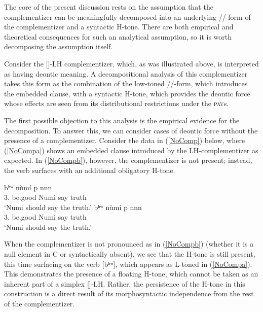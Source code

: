 \documentclass[output=paper,colorlinks,citecolor=brown]{langscibook}
\begin{document}
The core of the present discussion rests on the assumption that the complementizer can be meaningfully decomposed into an underlying /\mbuL/-form of the complementizer and a syntactic H-tone. There are both empirical and theoretical consequences for such an analytical assumption, so it is worth decomposing the assumption itself.

Consider the [\mbuLH]-LH complementizer, which, as was illustrated above, is interpreted as having deontic meaning. A decompositional analysis of this complementizer takes this form as the combination of the low-toned /\mbuL/-form, which introduces the embedded clause, with a syntactic H-tone, which provides the deontic force whose effects are seen from its distributional restrictions under the \textsc{pav}s.

The first possible objection to this analysis is the empirical evidence for the decomposition. To answer this, we can consider cases of deontic force without the presence of a complementizer. Consider the data in (\ref{NoComp}) below, where (\ref{NoCompa}) shows an embedded clause introduced by the LH-complementizer as expected. In (\ref{NoCompb}), however, the complementizer is not present; instead, the verb surfaces with an additional obligatory H-tone.

\ea \label{NoComp}
    \begin{xlist}
    \ex \label{NoCompa}
         {bʰʷ\ooL} {\mbuLH} {n{ù}m{í}} {p} {n\baruH\ds n\baruH n\schwaH} \\
             {3.} {be.good} {} {Numi} {say} {truth} \\
        \glt `Numi should say the truth.'
    \ex \label{NoCompb}
         {bʰʷ\ooL\ooH} {n{ù}m{í}} {p} {n\baruH\ds n\baruH n\schwaH} \\
             {3.} {be.good} {Numi} {say} {truth} \\
        \glt `Numi should say the truth.'
    \end{xlist}
\z

When the complementizer is not pronounced as in (\ref{NoCompb}) (whether it is a null element in C or syntactically absent), we see that the H-tone is still present, this time surfacing on the verb [b{ʰʷ}\ooL\ooH], which appears as L-toned in (\ref{NoCompa}). This demonstrates the presence of a floating H-tone, which cannot be taken as an inherent part of a simplex [\mbuLH]-LH. Rather, the persistence of the H-tone in this construction is a direct result of its morphosyntactic independence from the rest of the complementizer.
\end{document}
